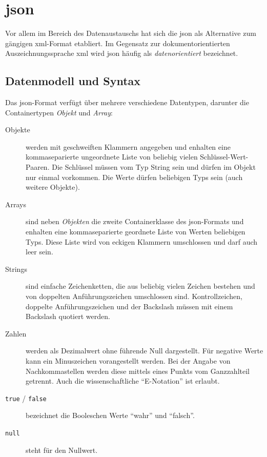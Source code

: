 \section{\acrfull{json}}
\label{sec:json}

Vor allem im Bereich des Datenaustauschs hat sich die \acrfull{json} als Alternative zum gängigen \acrshort{xml}-Format etabliert. Im Gegensatz zur dokumentorientierten Auszeichnungssprache \acrshort{xml} wird \acrshort{json} häufig als \emph{datenorientiert} bezeichnet.~\cite{gupta2007xmljson}

\subsection{Datenmodell und Syntax}
\label{sec:jsontypes}

Das \acrshort{json}-Format verfügt über mehrere verschiedene Datentypen, darunter die Containertypen \emph{Objekt} und \emph{Array}:~\cite{ecma404}

\begin{description}
    \item[Objekte] werden mit geschweiften Klammern angegeben und enhalten eine kommaseparierte ungeordnete Liste von beliebig vielen Schlüssel-Wert-Paaren. Die Schlüssel müssen vom Typ String sein und dürfen im Objekt nur einmal vorkommen. Die Werte dürfen beliebigen Typs sein (auch weitere Objekte).
    \item[Arrays] sind neben \emph{Objekten} die zweite Containerklasse des \acrshort{json}-Formats und enhalten eine kommaseparierte geordnete Liste von Werten beliebigen Typs. Diese Liste wird von eckigen Klammern umschlossen und darf auch leer sein.
    \item[Strings] sind einfache Zeichenketten, die aus beliebig vielen Zeichen bestehen und von doppelten Anführungszeichen umschlossen sind. Kontrollzeichen, doppelte Anführungszeichen und der Backslash müssen mit einem Backslash quotiert werden.
    \item[Zahlen] werden als Dezimalwert ohne führende Null dargestellt. Für negative Werte kann ein Minuszeichen vorangestellt werden. Bei der Angabe von Nachkommastellen werden diese mittels eines Punkts vom Ganzzahlteil getrennt. Auch die wissenschaftliche \enquote{E-Notation} ist erlaubt.
    \item[\texttt{true} / \texttt{false}] bezeichnet die Booleschen Werte \enquote{wahr} und \enquote{falsch}.
    \item[\texttt{null}] steht für den Nullwert.
\end{description}

